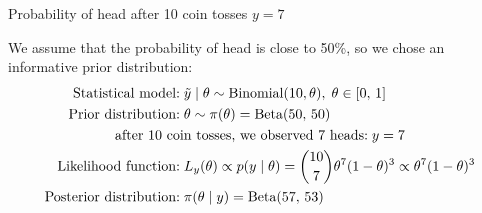 \begin{example}{Probability of head after 10 coin tosses $y=7$}{}

	We assume that the probability of head is close to 50\%, so we chose an
	informative prior distribution:
	\begin{alignat*}{1}
		\text{Statistical model:}      & \; \tilde y \mid \theta \sim \text{Binomial}(10, \theta), \; \theta \in [0,\,1] \\
		\text{Prior distribution:}     & \; \theta \sim \pi(\theta) = \text{Beta}(50,\,50)                               \\
		\span \text{after 10 coin tosses, we observed 7 heads:} \; y = 7                                                 \\
		\text{Likelihood function:}    & \; L_y(\theta) \propto p(y \mid \theta) = \binom{10}{7} \theta^7 (1-\theta)^3
		\propto \theta^7 (1-\theta)^3                                                                                    \\
		\text{Posterior distribution:} & \; \pi(\theta \mid y) = \text{Beta}(57,\,53)
	\end{alignat*}
	\begin{nscenter}
	\end{nscenter}

\end{example}
